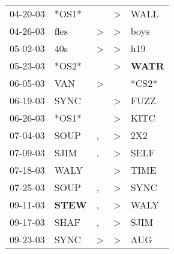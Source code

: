 \begin{supertabular}{p{0.07\textwidth}p{0.06\textwidth}p{0.02\textwidth}p{0.02\textwidth}p{0.06\textwidth}}
          04-20-03\textsuperscript{} &                            *OS1* &                  &     \textgreater &           WALL\textsuperscript{} \\
          04-26-03\textsuperscript{} &           fles\textsuperscript{} &     \textgreater &     \textgreater &           boys\textsuperscript{} \\
          05-02-03\textsuperscript{} &            40s\textsuperscript{} &     \textgreater &     \textgreater &            h19\textsuperscript{} \\
          05-23-03\textsuperscript{} &                            *OS2* &                  &     \textgreater &  \textbf{WATR\textsuperscript{}} \\
          06-05-03\textsuperscript{} &            VAN\textsuperscript{} &     \textgreater &                  &                            *CS2* \\
          06-19-03\textsuperscript{} &           SYNC\textsuperscript{} &                  &     \textgreater &           FUZZ\textsuperscript{} \\
          06-26-03\textsuperscript{} &                            *OS1* &                  &     \textgreater &           KITC\textsuperscript{} \\
          07-04-03\textsuperscript{} &           SOUP\textsuperscript{} &                , &     \textgreater &            2X2\textsuperscript{} \\
          07-09-03\textsuperscript{} &           SJIM\textsuperscript{} &                , &     \textgreater &           SELF\textsuperscript{} \\
          07-18-03\textsuperscript{} &           WALY\textsuperscript{} &                  &     \textgreater &           TIME\textsuperscript{} \\
          07-25-03\textsuperscript{} &           SOUP\textsuperscript{} &                , &     \textgreater &           SYNC\textsuperscript{} \\
          09-11-03\textsuperscript{} &  \textbf{STEW\textsuperscript{}} &                , &     \textgreater &           WALY\textsuperscript{} \\
          09-17-03\textsuperscript{} &           SHAF\textsuperscript{} &                , &     \textgreater &           SJIM\textsuperscript{} \\
          09-23-03\textsuperscript{} &           SYNC\textsuperscript{} &     \textgreater &     \textgreater &            AUG\textsuperscript{} \\

\end{supertabular}
